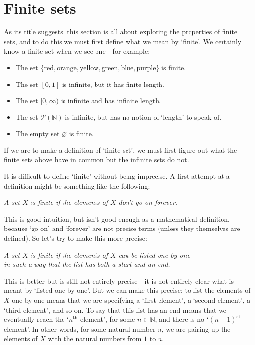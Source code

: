 \section{Finite sets}

As its title suggests, this section is all about exploring the properties of finite sets, and to do this we must first define what we mean by `finite'. We certainly know a finite set when we see one---for example:
\begin{itemize}
\item The set $\{ \text{red}, \text{orange}, \text{yellow}, \text{green}, \text{blue}, \text{purple} \}$ is finite.
\item The set $[0,1]$ is infinite, but it has finite length.
\item The set $[0,\infty)$ is infinite and has infinite length.
\item The set $\mathcal{P}(\mathbb{N})$ is infinite, but has no notion of `length' to speak of.
\item The empty set $\varnothing$ is finite.
\end{itemize}

If we are to make a definition of `finite set', we must first figure out what the finite sets above have in common but the infinite sets do not.

It is difficult to define `finite' without being imprecise. A first attempt at a definition might be something like the following:
\begin{center}
\textit{A set $X$ is finite if the elements of $X$ don't go on forever.}
\end{center}
This is good intuition, but isn't good enough as a mathematical definition, because `go on' and `forever' are not precise terms (unless they themselves are defined). So let's try to make this more precise:
\begin{center}
\textit{A set $X$ is finite if the elements of $X$ can be listed one by one\\
in such a way that the list has both a start and an end.}
\end{center}
This is better but is still not entirely precise---it is not entirely clear what is meant by `listed one by one'. But we can make this precise: to list the elements of $X$ one-by-one means that we are specifying a `first element', a `second element', a `third element', and so on. To say that this list has an end means that we eventually reach the `$n^{\text{th}}$ element', for some $n \in \mathbb{N}$, and there is no `$(n+1)^{\text{st}}$ element'. In other words, for some natural number $n$, we are pairing up the elements of $X$ with the natural numbers from $1$ to $n$.

